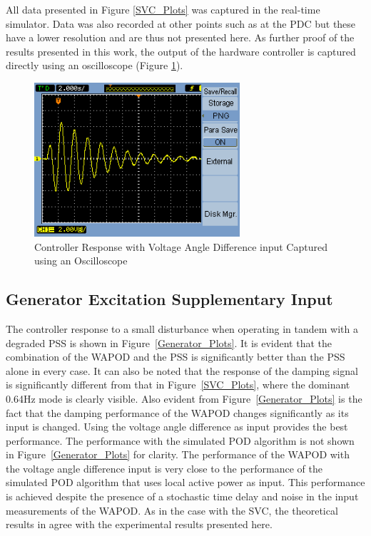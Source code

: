 \documentclass[journal]{IEEEtran}
\begin{document}

All data presented in Figure \ref{SVC_Plots} was captured in the real-time simulator. Data was also recorded at other points such as at the PDC but these have a lower resolution and are thus not presented here. As further proof of the results presented in this work, the output of the hardware controller is captured directly using an oscilloscope (Figure \ref{ScopeCapture}).

\begin{figure}[!th]
\centering
\includegraphics[width=3in]{Best_sample.png}
\caption{Controller Response with Voltage Angle Difference input Captured using an Oscilloscope}
\label{ScopeCapture}
\end{figure}
\subsection{Generator Excitation Supplementary Input}

The controller response to a small disturbance when operating in tandem with a degraded PSS is shown in Figure~\ref{Generator_Plots}. It is evident that the combination of the WAPOD and the PSS is significantly better than the PSS alone in every case. It can also be noted that the response of the damping signal is significantly different from that in Figure~\ref{SVC_Plots}, where the dominant 0.64Hz mode is clearly visible. Also evident from Figure~\ref{Generator_Plots} is the fact that the damping performance of the WAPOD changes significantly as its input is changed. Using the voltage angle difference as input provides the best performance. The performance with the simulated POD algorithm is not shown in Figure~\ref{Generator_Plots} for clarity. The performance of the WAPOD with the voltage angle difference input is very close to the performance of the simulated POD algorithm that uses local active power as input. This performance is achieved despite the presence of a stochastic time delay and noise in the input measurements of the WAPOD. As in the case with the SVC, the theoretical results in \cite{Yuwa} agree with the experimental results presented here.
\end{document}
